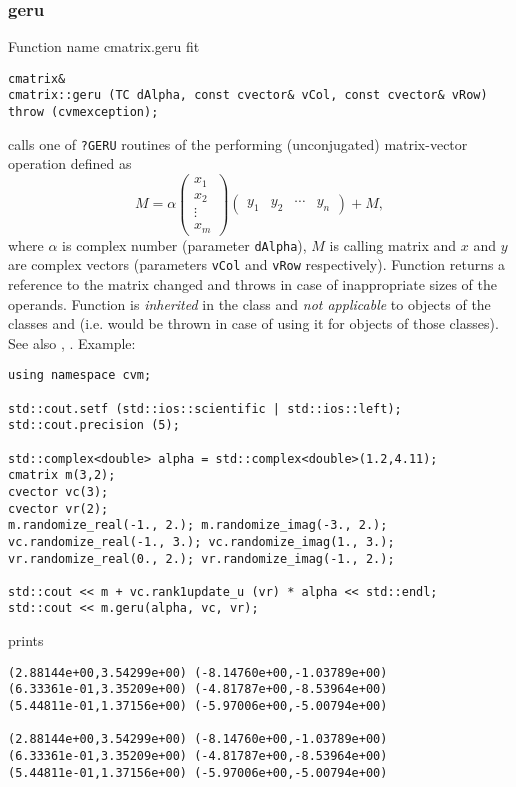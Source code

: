 \subsubsection{geru}
Function%
\pdfdest name {cmatrix.geru} fit
\begin{verbatim}
cmatrix&
cmatrix::geru (TC dAlpha, const cvector& vCol, const cvector& vRow)
throw (cvmexception);
\end{verbatim}
calls one of \verb"?GERU" routines of the
performing  
(unconjugated)
matrix-vector operation defined as
\begin{equation*}
M=\alpha\begin{pmatrix}
x_1 \\
x_2 \\
\vdots \\
x_m
\end{pmatrix}
\begin{pmatrix}
y_1 & y_2 & \cdots & y_n
\end{pmatrix} + M,
\end{equation*}
where $\alpha$ is  complex number
(parameter \verb"dAlpha"),
$M$ is  calling matrix
and $x$ and $y$ are complex vectors (parameters \verb"vCol"
and \verb"vRow" respectively).
Function
returns a reference to the matrix changed and throws
in case of inappropriate sizes of the operands.
Function is \emph{inherited} in  the class
 and
\emph{not applicable} to objects of the classes
 and
 (i.e.  would be thrown
in case of using it for objects of those classes).
See also
,
.
Example:
\begin{Verbatim}
using namespace cvm;

std::cout.setf (std::ios::scientific | std::ios::left); 
std::cout.precision (5);

std::complex<double> alpha = std::complex<double>(1.2,4.11);
cmatrix m(3,2);
cvector vc(3);
cvector vr(2);
m.randomize_real(-1., 2.); m.randomize_imag(-3., 2.);
vc.randomize_real(-1., 3.); vc.randomize_imag(1., 3.); 
vr.randomize_real(0., 2.); vr.randomize_imag(-1., 2.); 

std::cout << m + vc.rank1update_u (vr) * alpha << std::endl;
std::cout << m.geru(alpha, vc, vr);
\end{Verbatim}
prints
\begin{Verbatim}
(2.88144e+00,3.54299e+00) (-8.14760e+00,-1.03789e+00)
(6.33361e-01,3.35209e+00) (-4.81787e+00,-8.53964e+00)
(5.44811e-01,1.37156e+00) (-5.97006e+00,-5.00794e+00)

(2.88144e+00,3.54299e+00) (-8.14760e+00,-1.03789e+00)
(6.33361e-01,3.35209e+00) (-4.81787e+00,-8.53964e+00)
(5.44811e-01,1.37156e+00) (-5.97006e+00,-5.00794e+00)
\end{Verbatim}
\newpage



